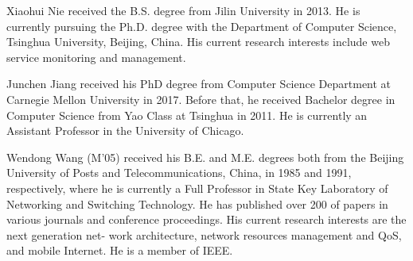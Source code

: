 \documentclass[10pt,journal,compsoc]{IEEEtran}
\begin{document}
\begin{IEEEbiography}
{Xiaohui Nie} received the B.S. degree from Jilin University in 2013. He is currently pursuing the Ph.D. degree with the Department of Computer Science, Tsinghua University, Beijing, China. His current research interests include web service monitoring and management.
\end{IEEEbiography}

\begin{IEEEbiography}
{Junchen Jiang} received his PhD degree from Computer Science Department at Carnegie Mellon University in 2017. Before that, he received Bachelor degree in Computer Science from Yao Class at Tsinghua in 2011. He is currently an Assistant Professor in the University of Chicago.
\end{IEEEbiography}

\begin{IEEEbiography}
{Wendong Wang} (M'05) received his B.E. and M.E. degrees both from the Beijing University of Posts and Telecommunications, China, in 1985 and 1991, respectively, where he is currently a Full Professor in State Key Laboratory of Networking and Switching Technology. He has published over 200 of papers in various journals and conference proceedings. His current research interests are the next generation net- work architecture, network resources management and QoS, and mobile Internet. He is a member of IEEE.
\end{IEEEbiography}
\end{document}
